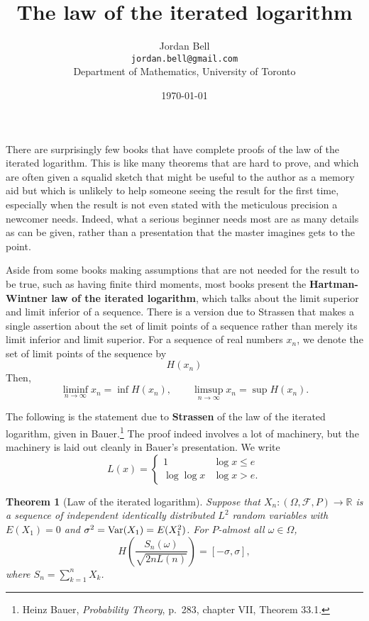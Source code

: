 \documentclass{article}
\newcommand{\Var}{\ensuremath\mathrm{Var}}
\newtheorem{theorem}{Theorem}
\theoremstyle{definition}
\begin{document}
\title{The law of the iterated logarithm}
\author{Jordan Bell\\ \texttt{jordan.bell@gmail.com}\\Department of Mathematics, University of Toronto}
\date{\today}

\maketitle

There are surprisingly few books that have complete proofs of the law of the iterated logarithm. This is like
many theorems that are hard to prove, and which are often given a squalid sketch that might be useful
to the author as a memory aid but
which is unlikely to help someone seeing the result for the first time, especially when the result is not even stated with the meticulous
precision a newcomer needs.
Indeed, what a serious beginner needs most are as many details as can be given, rather than a presentation that the master imagines
gets to the point. 

 Aside from some books
 making assumptions that are not needed for the result to be true, such as having finite third moments, most books
 present the \textbf{Hartman-Wintner law of the iterated logarithm}, which 
talks about  the limit superior and limit inferior of a sequence. There is a version due to
 Strassen that makes  a single assertion  about the set of limit points of a sequence rather than merely its limit inferior and limit superior.
 For a sequence of real numbers $x_n$, we denote the set of limit points of the sequence by
 \[
 H(x_n)
 \]
Then,
  \[
  \liminf_{n \to \infty} x_n = \inf H(x_n), \qquad \limsup_{n \to \infty} x_n = \sup H(x_n).
  \]
 
 The following is the statement due to \textbf{Strassen} of the law of the iterated logarithm, given
in Bauer.\footnote{Heinz
Bauer, {\em Probability Theory}, p.~283, chapter VII, Theorem 33.1.} The proof indeed involves a lot of machinery, but the machinery is laid out cleanly in Bauer's presentation.
We write 
\[
L(x) = \begin{cases}
1&\log x \leq e\\
\log \log x&\log x>e.
\end{cases}
\]

\begin{theorem}[Law of the iterated logarithm]
Suppose that $X_n:(\Omega,\mathscr{F},P) \to \mathbb{R}$ is a sequence of independent identically distributed $L^2$ random variables
with $E(X_1)=0$ and $\sigma^2=\Var(X_1)=E(X_1^2)$. For 
$P$-almost all $\omega \in \Omega$,
\[
H\left(\frac{S_n(\omega)}{\sqrt{2nL(n)}}\right) = [-\sigma,\sigma],
\]
where $S_n=\sum_{k=1}^n X_k$. 
\end{theorem}
\end{document}

